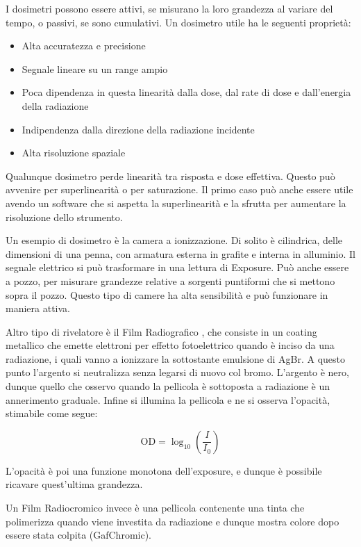 I dosimetri possono essere attivi, se misurano la loro grandezza al variare del tempo, o passivi, se sono cumulativi. Un dosimetro utile ha le seguenti proprietà:
\begin{itemize}
\item Alta accuratezza e precisione
\item Segnale lineare su un range ampio
\item Poca dipendenza in questa linearità dalla dose, dal rate di dose e dall'energia della radiazione
\item Indipendenza dalla direzione della radiazione incidente
\item Alta risoluzione spaziale
\end{itemize}

Qualunque dosimetro perde linearità tra risposta e dose effettiva. Questo può avvenire per superlinearità o per saturazione. Il primo caso può anche essere utile avendo un software che si aspetta la superlinearità e la sfrutta per aumentare la risoluzione dello strumento.

Un esempio di dosimetro è la camera a ionizzazione. Di solito è cilindrica, delle dimensioni di una penna, con armatura esterna in grafite e interna in alluminio. Il segnale elettrico si può trasformare in una lettura di Exposure. Può anche essere a pozzo, per misurare grandezze relative a sorgenti puntiformi che si mettono sopra il pozzo. Questo tipo di camere ha alta sensibilità e può funzionare in maniera attiva.

Altro tipo di rivelatore è il Film Radiografico \cite{Films}, che consiste in un coating metallico che emette elettroni per effetto fotoelettrico quando è inciso da una radiazione, i quali vanno a ionizzare la sottostante emulsione di AgBr. A questo punto l'argento si neutralizza senza legarsi di nuovo col bromo. L'argento è nero, dunque quello che osservo quando la pellicola è sottoposta a radiazione è un annerimento graduale.
Infine si illumina la pellicola e ne si osserva l'opacità, stimabile come segue:

\begin{equation}
\text{OD}=\log_{10}\left(\frac{I}{I_0}\right)
\end{equation}

L'opacità è poi una funzione monotona dell'exposure, e dunque è possibile ricavare quest'ultima grandezza.

Un Film Radiocromico invece è una pellicola contenente una tinta che polimerizza quando viene investita da radiazione e dunque mostra colore dopo essere stata colpita (GafChromic).

